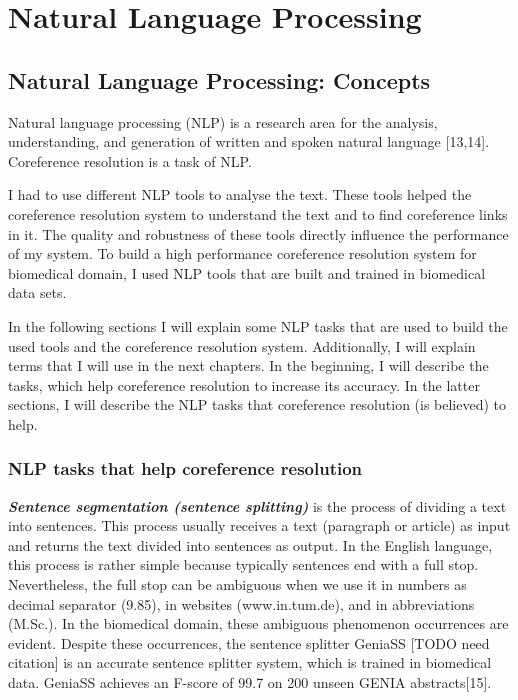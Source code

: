 \chapter{Natural Language Processing}
\label{chapter:Natural Language Processing}
\section{Natural Language Processing: Concepts}

Natural language processing (NLP) is a research area for the analysis, understanding, and generation of written and spoken natural language [13,14]. Coreference resolution is a task of NLP.

I had to use different NLP tools to analyse the text. These tools helped  the coreference resolution system to understand the text and to find coreference links in it. The quality and robustness of these tools directly influence the performance of my system. To build a high performance coreference resolution system for biomedical domain, I used NLP tools that are built and trained in biomedical data sets.

In the following sections I will explain some NLP tasks that are used to build the used tools and the coreference resolution system. Additionally, I will explain terms that I will use in the next chapters. In the beginning, I will describe the tasks, which help coreference resolution to increase its accuracy. In the latter sections, I will describe the NLP tasks that coreference resolution (is believed) to help.

\subsection{NLP tasks that help coreference resolution}

\emph{ \textbf{ Sentence segmentation (sentence splitting)}} is the process of dividing a text into sentences. This process usually receives a text (paragraph or article) as input and returns the text divided into sentences as output.
In the English language, this process is rather simple because typically sentences end with a full stop. Nevertheless, the full stop can be ambiguous when we use it in numbers as decimal separator (9.85), in websites (www.in.tum.de), and in abbreviations (M.Sc.). In the biomedical domain, these ambiguous phenomenon occurrences are evident.
Despite these occurrences, the sentence splitter GeniaSS [TODO need citation] is an accurate sentence splitter system, which is trained in biomedical data. GeniaSS achieves an F-score of 99.7 on 200 unseen GENIA abstracts[15].\\

